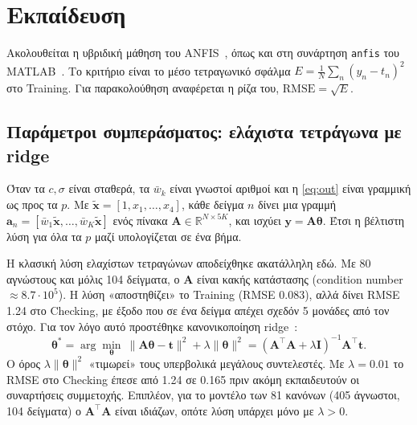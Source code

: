 \documentclass[conference]{IEEEtran}
\begin{document}
\section{Εκπαίδευση}

Ακολουθείται η υβριδική μάθηση του ANFIS~\cite{jang1993}, όπως και στη συνάρτηση
\texttt{anfis} του MATLAB~\cite{matlab}. Το κριτήριο είναι το μέσο τετραγωνικό σφάλμα
$E=\frac1N\sum_n (y_n-t_n)^2$ στο Training. Για παρακολούθηση αναφέρεται η
ρίζα του, $\mathrm{RMSE}=\sqrt{E}$.

\subsection{Παράμετροι συμπεράσματος: ελάχιστα τετράγωνα με ridge}
Όταν τα $c,\sigma$ είναι σταθερά, τα $\bar w_k$ είναι γνωστοί αριθμοί και η
\eqref{eq:out} είναι γραμμική ως προς τα $p$. Με
$\tilde{\mathbf{x}}=[1,x_1,\ldots,x_4]$, κάθε δείγμα $n$ δίνει μια γραμμή
$\mathbf{a}_n=[\bar w_1\tilde{\mathbf{x}},\ldots,\bar w_K\tilde{\mathbf{x}}]$
ενός πίνακα $\mathbf{A}\in\mathbb{R}^{N\times 5K}$, και ισχύει
$\mathbf{y}=\mathbf{A}\boldsymbol\theta$. Έτσι η βέλτιστη λύση για όλα τα
$p$ μαζί υπολογίζεται σε ένα βήμα.

Η κλασική λύση ελαχίστων τετραγώνων αποδείχθηκε ακατάλληλη εδώ. Με 80 αγνώστους
και μόλις 104 δείγματα, ο $\mathbf{A}$ είναι κακής κατάστασης (condition number
$\approx 8.7\cdot10^{5}$). Η λύση «αποστηθίζει» το Training (RMSE 0.083),
αλλά δίνει RMSE 1.24 στο Checking, με έξοδο που σε ένα δείγμα απέχει σχεδόν 5 μονάδες
από τον στόχο. Για τον λόγο αυτό προστέθηκε κανονικοποίηση ridge~\cite{hoerl1970}:
\begin{equation}
\boldsymbol\theta^\ast=\arg\min_{\boldsymbol\theta}\
\|\mathbf{A}\boldsymbol\theta-\mathbf{t}\|^2+\lambda\|\boldsymbol\theta\|^2
=(\mathbf{A}^{\!\top}\!\mathbf{A}+\lambda\mathbf{I})^{-1}\mathbf{A}^{\!\top}\mathbf{t}.
\label{eq:ridge}
\end{equation}
Ο όρος $\lambda\|\boldsymbol\theta\|^2$ «τιμωρεί» τους υπερβολικά μεγάλους
συντελεστές. Με $\lambda=0.01$ το RMSE στο Checking έπεσε από 1.24 σε 0.165
πριν ακόμη εκπαιδευτούν οι συναρτήσεις συμμετοχής. Επιπλέον, για το μοντέλο των 81
κανόνων (405 άγνωστοι, 104 δείγματα) ο $\mathbf{A}^{\!\top}\!\mathbf{A}$ είναι
ιδιάζων, οπότε λύση υπάρχει μόνο με $\lambda>0$.
\end{document}
